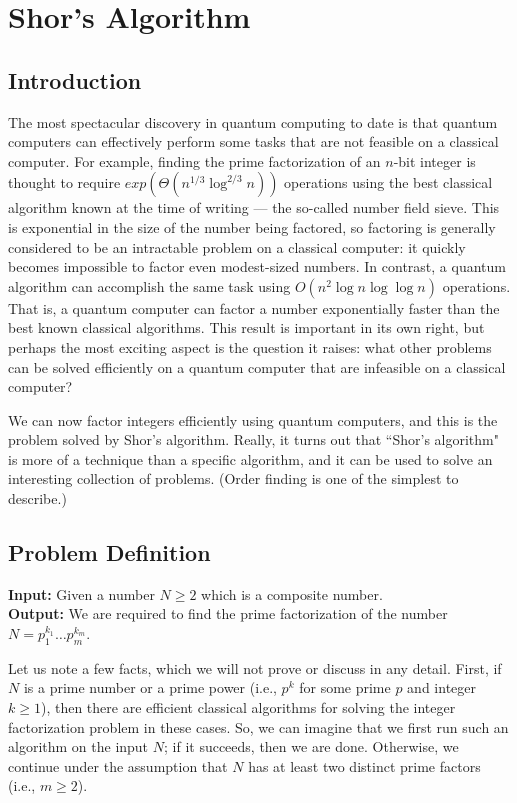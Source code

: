 \chapter{Shor's Algorithm}
\section{Introduction}
The most spectacular discovery in quantum computing to date is that quantum computers can effectively perform some tasks that are not feasible on a classical computer. For example, finding the prime factorization of an $n$-bit integer is thought to require $exp(\Theta(n^{1/3}\log^{2/3} n))$ operations using the best classical algorithm known at the time of writing — the so-called number field sieve. This is exponential in the size of the number being factored, so factoring is generally considered to be an intractable problem on a classical computer: it quickly becomes impossible to factor even modest-sized numbers. In contrast, a quantum algorithm can accomplish the same task using $O(n^2 \log n \log \log n)$ operations. That is, a quantum computer can factor a number exponentially faster than the best known classical algorithms. This result is important in its own right, but perhaps the most exciting aspect is the question it raises: what other problems can be solved efficiently on a quantum computer that are infeasible on a classical computer?

We can now factor integers efficiently using quantum computers, and this is the problem solved by Shor's algorithm. Really, it turns out that ``Shor's algorithm" is more of a technique than a specific algorithm, and it can be used to solve an interesting collection of problems. (Order finding is one of the simplest to describe.)

\section{Problem Definition}
\begin{definition}
    \textbf{Input:} Given a number $N \geq 2$ which is a composite number. \\
    \textbf{Output:} We are required to find the prime factorization of the number $N = p_1^{k_1} \ldots p_m^{k_m}$.
\end{definition}


Let us note a few facts, which we will not prove or discuss in any detail. First, if $N$ is a prime number or a prime power (i.e., $p^k$ for some prime $p$ and integer $k \geq 1$), then there are efficient classical algorithms for solving the integer factorization problem in these cases. So, we can imagine that we first run such an algorithm on the input $N$; if it succeeds, then we are done. Otherwise, we continue under the assumption that $N$ has at least two distinct prime factors (i.e., $m \geq 2$).

